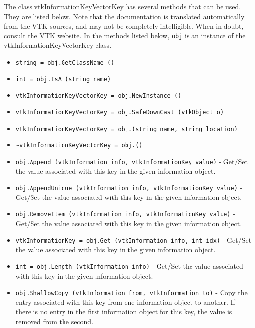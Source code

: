 The class vtkInformationKeyVectorKey has several methods that can be used.
  They are listed below.
Note that the documentation is translated automatically from the VTK sources,
and may not be completely intelligible.  When in doubt, consult the VTK website.
In the methods listed below, \verb|obj| is an instance of the vtkInformationKeyVectorKey class.
\begin{itemize}
\item  \verb|string = obj.GetClassName ()|

\item  \verb|int = obj.IsA (string name)|

\item  \verb|vtkInformationKeyVectorKey = obj.NewInstance ()|

\item  \verb|vtkInformationKeyVectorKey = obj.SafeDownCast (vtkObject o)|

\item  \verb|vtkInformationKeyVectorKey = obj.(string name, string location)|

\item  \verb|~vtkInformationKeyVectorKey = obj.()|

\item  \verb|obj.Append (vtkInformation info, vtkInformationKey value)| -  Get/Set the value associated with this key in the given
 information object.

\item  \verb|obj.AppendUnique (vtkInformation info, vtkInformationKey value)| -  Get/Set the value associated with this key in the given
 information object.

\item  \verb|obj.RemoveItem (vtkInformation info, vtkInformationKey value)| -  Get/Set the value associated with this key in the given
 information object.

\item  \verb|vtkInformationKey = obj.Get (vtkInformation info, int idx)| -  Get/Set the value associated with this key in the given
 information object.

\item  \verb|int = obj.Length (vtkInformation info)| -  Get/Set the value associated with this key in the given
 information object.

\item  \verb|obj.ShallowCopy (vtkInformation from, vtkInformation to)| -  Copy the entry associated with this key from one information
 object to another.  If there is no entry in the first information
 object for this key, the value is removed from the second.

\end{itemize}
